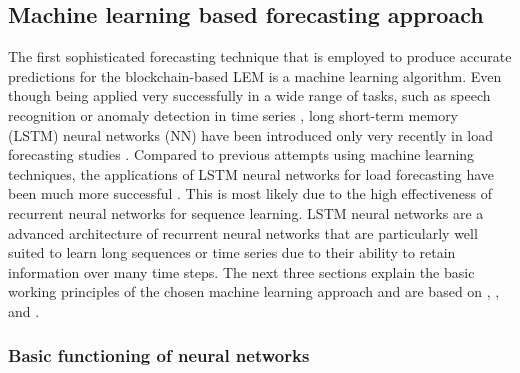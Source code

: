 
\subsection{Machine learning based forecasting approach} \label{Sec:Method;Subsec:LSTM}

The first sophisticated forecasting technique that is employed to produce accurate predictions for the blockchain-based LEM is a machine learning algorithm. Even though being applied very successfully in a wide range of tasks, such as speech recognition \citep{Graves:2013} or anomaly detection in time series \citep{Malhotra:2015}, long short-term memory (LSTM) neural networks (NN) have been introduced only very recently in load forecasting studies \citep[e.g.,][]{Kong:2018,Shi:2017,Gan:2017,Chen:2018}. Compared to previous attempts using machine learning techniques, the applications of LSTM neural networks for load forecasting have been much more successful \citep{Kong:2018,Shi:2017}. This is most likely due to the high effectiveness of recurrent neural networks for sequence learning. LSTM neural networks are a advanced architecture of recurrent neural networks that are particularly well suited to learn long sequences or time series due to their ability to retain information over many time steps. The next three sections explain the basic working principles of the chosen machine learning approach and are based on \citet{chollet:2018}, \citet{Lipton:2015}, and \citet{Gan:2017}.



\subsubsection{Basic functioning of neural networks}

